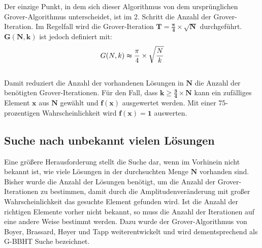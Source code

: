 Der einzige Punkt, in dem sich dieser Algorithmus von dem ursprünglichen Grover-Algorithmus unterscheidet, ist im 2. Schritt die Anzahl der Grover-Iteration. 
Im Regelfall wird die Grover-Iteration $\mathbf{T = \frac{\pmb\pi}{4} \times \sqrt{N}}$ durchgeführt. $\mathbf{G(N,k)}$ ist jedoch definiert mit:
\\
\begin{equation}
	{G(N,k) \thickapprox \frac{\pi}{4} \times \sqrt{\frac{N}{k}}}
\end{equation}
\\
Damit reduziert die Anzahl der vorhandenen Lösungen in $\mathbf{N}$ die Anzahl der benötigten Grover-Iterationen. 
Für den Fall, dass $\mathbf{k \geq \frac{3}{4} \times N}$ kann ein zufälliges Element $\mathbf{x}$ aus $\mathbf{N}$ gewählt und $\mathbf{f(x)}$ ausgewertet werden. 
Mit einer 75-prozentigen Wahrscheinlichkeit wird $\mathbf{f(x) = 1}$ auswerten.

\subsection{Suche nach unbekannt vielen Lösungen} \label{gbbht}
Eine größere Herausforderung stellt die Suche dar, wenn im Vorhinein nicht bekannt ist, wie viele Lösungen in der durchsuchten Menge $\mathbf{N}$ vorhanden sind. 
Bisher wurde die Anzahl der Lösungen benötigt, um die Anzahl der Grover-Iterationen zu bestimmen, damit durch die Amplitudenveränderung mit großer Wahrscheinlichkeit das gesuchte Element gefunden wird. 
Ist die Anzahl der richtigen Elemente vorher nicht bekannt, so muss die Anzahl der Iterationen auf eine andere Weise bestimmt werden. 
Dazu wurde der Grover-Algorithmus von Boyer, Brassard, Høyer und Tapp weiterentwickelt und wird dementsprechend als G-BBHT Suche bezeichnet.

